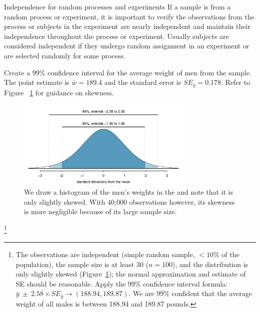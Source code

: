 \begin{caution}
{Independence for random processes and experiments}
{If a sample is from a random process or experiment, it is important to verify the observations from the process or subjects in the experiment are nearly independent and maintain their independence throughout the process or experiment. Usually subjects are considered independent if they undergo random assignment in an experiment or are selected randomly for some process.}
\end{caution}

\begin{exercise} \label{find99CIForBRFSSWeightExercise}
Create a 99\% confidence interval for the average weight of men from the  sample. The point estimate is $\bar{w} = 189.4$ and the standard error is $SE_{\bar{y}} = 0.178$. Refer to Figure ~\ref{brfssSampHist} for guidance on skewness.
\begin{figure}
\centering
\includegraphics[width=0.75\textwidth]{ch_inference_foundations_oi_biostat/figures/choosingZForCI/choosingZForCI.pdf}
\caption{We draw a histogram of the men's weights in the  and note that it is only slightly skewed. With 40,000 observations however, its skewness is more negligible because of its large sample size.}
\label{brfssSampHist}
\end{figure}
\footnote{The observations are independent (simple random sample, $<10\%$ of the population), the sample size is at least 30 ($n=100$), and the distribution is only slightly skewed (Figure~\ref{brfssSampHist}); the normal approximation and estimate of SE should be reasonable.  Apply the 99\% confidence interval formula: $\bar{y}\ \pm\ 2.58 \times  SE_{\bar{y}} \rightarrow (188.94, 189.87)$. We are 99\% confident that the average weight of all males is between 188.94 and 189.87 pounds.}
\end{exercise}

